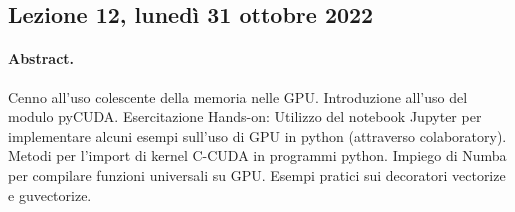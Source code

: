 \subsection{Lezione 12, lunedì 31 ottobre 2022}

\paragraph{Abstract.} Cenno all'uso colescente della memoria nelle GPU. Introduzione all'uso del modulo pyCUDA. Esercitazione Hands-on: Utilizzo del notebook Jupyter per implementare alcuni esempi sull'uso di GPU in python (attraverso colaboratory). Metodi per l'import di kernel C-CUDA in programmi python. Impiego di Numba per compilare funzioni universali su GPU. Esempi pratici sui decoratori vectorize e guvectorize.
